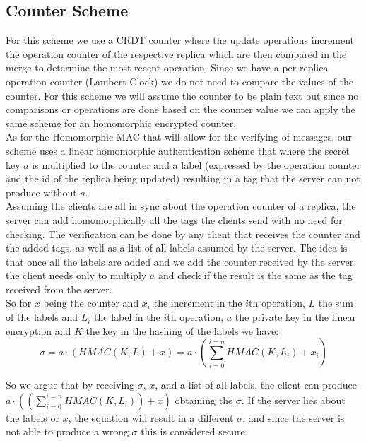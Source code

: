 \documentclass{article}
\begin{document}
\newpage
\subsection{Counter Scheme}
For this scheme we use a CRDT counter where the update operations increment the operation counter of the respective replica which are then compared in the merge to determine the most recent operation. Since we have a per-replica operation counter (Lambert Clock) we do not need to compare the values of the counter. For this scheme we will assume the counter to be plain text but since no comparisons or operations are done based on the counter value we can apply the same scheme for an homomorphic encrypted counter.\\

As for the Homomorphic MAC that will allow for the verifying of messages, our scheme uses a linear homomorphic authentication scheme that where the secret key $a$ is multiplied to the counter and a label (expressed by the operation counter and the id of the replica being updated) resulting in a tag that the server can not produce without $a$.\\

Assuming the clients are all in sync about the operation counter of a replica, the server can add homomorphically all the tags the clients send with no need for checking. The verification can be done by any client that receives the counter and the added tags, as well as a list of all labels assumed by the server. The idea is that once all the labels are added and we add the counter received by the server, the client needs only to multiply $a$ and check if the result is the same as the tag received from the server.\\

So for $x$ being the counter and $x_i$ the increment in the $i$th operation, $L$ the sum of the labels and $L_i$ the label in the $i$th operation, $a$ the private key in the linear encryption and $K$ the key in the hashing of the labels we have:
\begin{equation}
   \sigma = a\cdot (HMAC(K,L)+x) = a \cdot (\sum_{i=0}^{i=n}HMAC(K,L_i) + x_i )
\end{equation}

So we argue that by receiving $\sigma$, $x$, and a list of all labels, the client can produce $a \cdot ((\sum_{i=0}^{i=n}HMAC(K,L_i)) + x)$ obtaining the $\sigma$. If the server lies about the labels or $x$, the equation will result in a different $\sigma$, and since the server is not able to produce a wrong $\sigma$ this is considered secure.\\
\end{document}
